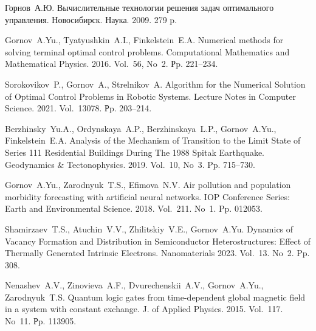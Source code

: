 \begin{thebibliography}{9} %

	Горнов~А.Ю. Вычислительные технологии решения задач оптимального управления. Новосибирск. Наука. 2009. 279 p.

	Gornov~A.Yu., Tyatyushkin~A.I., Finkelstein~E.A. Numerical methods for solving terminal optimal control problems. Computational Mathematics and Mathematical Physics. 2016. Vol.~56, No~2. Рp. 221--234.


 Sorokovikov~P., Gornov~A., Strelnikov~A. Algorithm for the Numerical Solution of Optimal Control Problems in Robotic Systems. Lecture Notes in Computer Science. 2021. Vol.~13078. Рp. 203--214.

 Berzhinsky~Yu.A., Ordynskaya~A.P., Berzhinskaya~L.P., Gornov~A.Yu., Finkelstein~E.A. Analysis of the Mechanism of Transition to the Limit State of Series 111 Residential Buildings During The 1988 Spitak Earthquake. Geodynamics \& Tectonophysics. 2019. Vol.~10, No~3. Pp. 715--730.


	Gornov~A.Yu., Zarodnyuk~T.S., Efimova~N.V. Air pollution and population morbidity forecasting with artificial neural networks. IOP Conference Series: Earth and Environmental Science. 2018. Vol.~211. No~1. Pp. 012053.

 Shamirzaev~T.S., Atuchin~V.V., Zhilitskiy~V.E., Gornov~A.Yu. Dynamics of Vacancy Formation and Distribution in Semiconductor Heterostructures: Effect of Thermally Generated Intrinsic Electrons. Nanomaterials 2023. Vol.~13. No~2. Pp. 308.

 Nenashev~A.V., Zinovieva~A.F., Dvurechenskii~A.V., Gornov~A.Yu., Zarodnyuk~T.S. Quantum logic gates from time-dependent global magnetic field in a system with constant exchange. J. of Applied Physics. 2015. Vol.~117. No~11. Рp. 113905.


\end{thebibliography}




%

